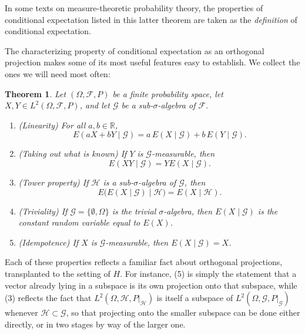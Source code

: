 \documentclass[reqno]{amsart}
\newtheorem{thm}{Theorem}[section]
\theoremstyle{definition}
\numberwithin{equation}{section}
\begin{document}
In some texts on measure-theoretic probability theory, the properties of conditional expectation listed in this latter theorem are taken as the \textit{definition} of conditional expectation.

The characterizing property of conditional expectation as an orthogonal projection makes some of its most useful features easy to establish. We collect the ones we will need most often:

\begin{thm}\label{thm:cond-exp-properties}
Let $(\Omega, \mathcal{F}, P)$ be a finite probability space, let $X, Y \in L^2(\Omega, \mathcal{F}, P)$, and let $\mathcal{G}$ be a sub-$\sigma$-algebra of $\mathcal{F}$.
\begin{enumerate}
\item (\textit{Linearity}) For all $a,b \in \mathbb{R}$,
	\[
	E(aX + bY \mid \mathcal{G}) = a\,E(X\mid \mathcal{G}) + b\,E(Y \mid \mathcal{G}).
	\]
\item (\textit{Taking out what is known}) If $Y$ is $\mathcal{G}$-measurable, then
	\[
	E(XY \mid \mathcal{G}) = Y E(X \mid \mathcal{G}).
	\]
\item (\textit{Tower property}) If $\mathcal{H}$ is a sub-$\sigma$-algebra of $\mathcal{G}$, then
	\[
	E\big(E(X\mid \mathcal{G}) \mid \mathcal{H}\big) = E(X \mid \mathcal{H}).
	\]
\item (\textit{Triviality}) If $\mathcal{G} = \{\emptyset, \Omega\}$ is the trivial $\sigma$-algebra, then $E(X \mid \mathcal{G})$ is the constant random variable equal to $E(X)$.
\item (\textit{Idempotence}) If $X$ is $\mathcal{G}$-measurable, then $E(X \mid \mathcal{G}) = X$.
\end{enumerate}
\end{thm}

Each of these properties reflects a familiar fact about orthogonal projections, transplanted to the setting of $H$. For instance, (5) is simply the statement that a vector already lying in a subspace is its own projection onto that subspace, while (3) reflects the fact that $L^2(\Omega,\mathcal{H},P|_{\mathcal{H}})$ is itself a subspace of $L^2(\Omega,\mathcal{G},P|_{\mathcal{G}})$ whenever $\mathcal{H} \subset \mathcal{G}$, so that projecting onto the smaller subspace can be done either directly, or in two stages by way of the larger one.
\end{document}
